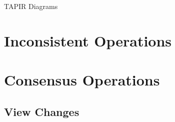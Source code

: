 \documentclass{article}
\begin{document}
  \begin{center}
    \huge TAPIR Diagrams
  \end{center}

  \section*{Inconsistent Operations}
  {\centering }
  \section*{Consensus Operations}
  {\centering }
  \begin{landscape}
    \section*{View Changes}
    {\centering }
  \end{landscape}
\end{document}
